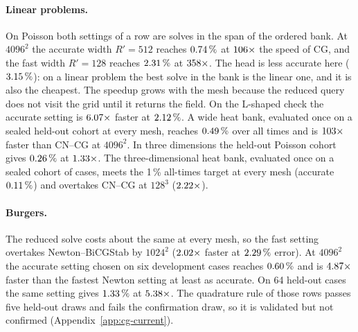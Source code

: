 \documentclass{article}
\begin{document}
\paragraph{Linear problems.}
On Poisson both settings of a row are solves in the span of the ordered
bank. At $4096^2$ the accurate width $R'=512$ reaches
$0.74\,\%$ at $106\times$ the speed of CG, and the fast
width $R'=128$ reaches $2.31\,\%$ at $358\times$. The
head is less accurate here ($3.15\,\%$): on a linear problem
the best solve in the bank is the linear one, and it is also the cheapest.
The speedup grows with the mesh because the reduced query does not visit
the grid until it returns the field. On the L-shaped check the accurate
setting is $6.07\times$ faster at $2.12\,\%$. A
wide heat bank, evaluated once on a sealed held-out cohort at every mesh,
reaches $0.49\,\%$ over all times and is
$103\times$ faster than CN--CG at $4096^2$. In three
dimensions the held-out Poisson cohort gives
$0.26\,\%$ at $1.33\times$. The
three-dimensional heat bank, evaluated once on a sealed cohort of
\nHeatNewCases{} cases, meets the 1\,\% all-times target at every mesh
(accurate $0.11\,\%$) and overtakes CN--CG at $128^3$
($2.22\times$). 

\paragraph{Burgers.}
The reduced solve costs about the same at every mesh, so the fast setting
overtakes Newton--BiCGStab by $1024^2$ ($2.02\times$ faster
at $2.29\,\%$ error). At $4096^2$ the accurate setting
chosen on six development cases reaches $0.60\,\%$
and is $4.87\times$ faster than the fastest Newton
setting at least as accurate. On 64 held-out cases the same setting gives
$1.33\,\%$ at
$5.38\times$. The quadrature rule of those rows
passes five held-out draws and fails the confirmation draw, so it is
validated but not confirmed (Appendix~\ref{app:cg-current}).
\end{document}
